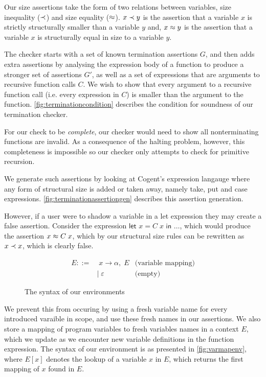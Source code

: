 Our size assertions take the form of two relations between variables, 
size inequality ($\prec$) and size equality ($\approx$).
$x \prec y$ is the assertion that a variable $x$ is strictly
structurally smaller than a variable $y$ and, $x \approx y$ is the assertion that a
variable $x$ is structurally equal in size to a variable $y$.

The checker starts with a set of known termination assertions $G$, and then adds
extra assertions by analysing the expression body of a function to produce
a stronger set of assertions $G'$, as well as a set of expressions that are arguments
to recursive function calls $C$. We wish to show that every argument to a recursive function
call (i.e. every expression in $C$) is smaller than the argument to the function. 
\autoref{fig:terminationcondition} describes the
condition for soundness of our termination checker. 

For our check to be \emph{complete},
our checker would need to show all nonterminating functions are invalid.
As a consequence of the halting problem, however, this completeness is impossible
so our checker only attempts to check for primitive recursion.

We generate such assertions by looking at Cogent's expression langauge 
where any form of structural size is added or taken away, namely
\textsf{take}, \textsf{put} and \textsf{case} expressions.
\autoref{fig:terminationassertiongen} describes this assertion generation.

However, if a user were to shadow a variable in a let expression they may
create a false assertion. Consider the expression 
$\textsf{let } x = C\; x \textsf{ in } \dots$, which would produce the
assertion $x \approx C\; x$, which by our structural size rules can be rewritten as
$x \prec x$, which is clearly false.

\begin{figure}
    \centering
    \begin{align*}
        E ::=&\; x \rightarrow \alpha,\; E  & \text{(variable mapping)} \\
             &|\; \varepsilon                 & \text{(empty)}
    \end{align*}
    \caption{The syntax of our environments}
    \label{fig:varmapenv}
\end{figure}

We prevent this from occuring by using a fresh variable name for every
introduced varaible in scope, and use these fresh names in our assertions.
We also store a mapping of program variables to fresh variables names in a
context $E$, which we update as we encounter new variable definitions in the
function expression. The syntax of our environment is as
presented in \autoref{fig:varmapenv}, where $E[x]$ denotes the lookup
of a variable $x$ in $E$, which returns the first mapping of $x$ found in $E$. 

